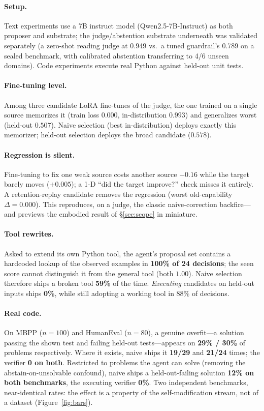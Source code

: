 \documentclass{article}
\begin{document}
\paragraph{Setup.} Text experiments use a 7B instruct model (Qwen2.5-7B-Instruct) as both proposer and
substrate; the judge/abstention substrate underneath was validated separately (a zero-shot reading judge
at 0.949 vs.\ a tuned guardrail's 0.789 on a sealed benchmark, with calibrated abstention transferring
to 4/6 unseen domains). Code experiments execute real Python against held-out unit tests.

\paragraph{Fine-tuning level.} Among three candidate LoRA fine-tunes of the judge, the one trained on a
single source memorizes it (train loss $0.000$, in-distribution $0.993$) and generalizes worst
(held-out $0.507$). Naive selection (best in-distribution) deploys exactly this memorizer; held-out
selection deploys the broad candidate ($0.578$).

\paragraph{Regression is silent.} Fine-tuning to fix one weak source costs another source $-0.16$ while
the target barely moves ($+0.005$); a 1-D ``did the target improve?'' check misses it entirely. A
retention-replay candidate removes the regression (worst old-capability $\Delta = 0.000$). This
reproduces, on a judge, the classic naive-correction backfire---and previews the embodied result of
\S\ref{sec:scope} in miniature.

\paragraph{Tool rewrites.} Asked to extend its own Python tool, the agent's proposal set contains a
hardcoded lookup of the observed examples in \textbf{100\% of 24 decisions}; the seen score cannot
distinguish it from the general tool (both $1.00$). Naive selection therefore ships a broken tool
\textbf{59\%} of the time. \emph{Executing} candidates on held-out inputs ships \textbf{0\%}, while
still adopting a working tool in 88\% of decisions.

\paragraph{Real code.} On MBPP ($n{=}100$) and HumanEval ($n{=}80$), a genuine overfit---a solution
passing the shown test and failing held-out tests---appears on \textbf{29\% / 30\%} of problems
respectively. Where it exists, naive ships it \textbf{19/29} and \textbf{21/24} times; the verifier
\textbf{0 on both}. Restricted to problems the agent can solve (removing the abstain-on-unsolvable
confound), naive ships a held-out-failing solution \textbf{12\% on both benchmarks}, the executing
verifier \textbf{0\%}. Two independent benchmarks, near-identical rates: the effect is a property of the
self-modification stream, not of a dataset (Figure~\ref{fig:bars}).
\end{document}
